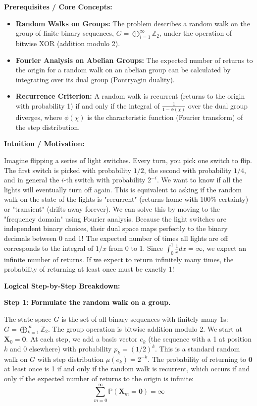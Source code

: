\begin{solution}
\textbf{Prerequisites / Core Concepts:}
\begin{itemize}
    \item \textbf{Random Walks on Groups:} The problem describes a random walk on the group of finite binary sequences, $G = \bigoplus_{i=1}^\infty \mathbb{Z}_2$, under the operation of bitwise XOR (addition modulo 2).
    \item \textbf{Fourier Analysis on Abelian Groups:} The expected number of returns to the origin for a random walk on an abelian group can be calculated by integrating over its dual group (Pontryagin duality).
    \item \textbf{Recurrence Criterion:} A random walk is recurrent (returns to the origin with probability 1) if and only if the integral of $\frac{1}{1 - \phi(\chi)}$ over the dual group diverges, where $\phi(\chi)$ is the characteristic function (Fourier transform) of the step distribution.
\end{itemize}

\textbf{Intuition / Motivation:}

Imagine flipping a series of light switches. Every turn, you pick one switch to flip. The first switch is picked with probability $1/2$, the second with probability $1/4$, and in general the $i$-th switch with probability $2^{-i}$.
We want to know if all the lights will eventually turn off again. This is equivalent to asking if the random walk on the state of the lights is "recurrent" (returns home with 100\% certainty) or "transient" (drifts away forever).
We can solve this by moving to the "frequency domain" using Fourier analysis. Because the light switches are independent binary choices, their dual space maps perfectly to the binary decimals between 0 and 1! The expected number of times all lights are off corresponds to the integral of $1/x$ from 0 to 1. Since $\int_0^1 \frac{1}{x} dx = \infty$, we expect an infinite number of returns. If we expect to return infinitely many times, the probability of returning at least once must be exactly 1!

\textbf{Logical Step-by-Step Breakdown:}

\textbf{Step 1: Formulate the random walk on a group.}

The state space $G$ is the set of all binary sequences with finitely many 1s: $G = \bigoplus_{k=1}^\infty \mathbb{Z}_2$. The group operation is bitwise addition modulo 2.
We start at $\mathbf{X}_0 = \mathbf{0}$.
At each step, we add a basis vector $e_k$ (the sequence with a 1 at position $k$ and 0 elsewhere) with probability $p_k = (1/2)^k$.
This is a standard random walk on $G$ with step distribution $\mu(e_k) = 2^{-k}$.
The probability of returning to $\mathbf{0}$ at least once is 1 if and only if the random walk is recurrent, which occurs if and only if the expected number of returns to the origin is infinite:
\[ \sum_{m=0}^\infty \mathbb{P}(\mathbf{X}_m = \mathbf{0}) = \infty \]


\end{solution}
